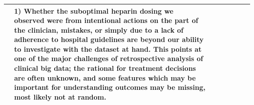 \begin{table}[!th]
\begin{tabular}{|p{3 em}|p{3 em}|p{3 em}|p{3em}|p{6em}|p{9em}|p{6 em}|p{6em}|}
& 
\textbf{1)} Whether the suboptimal heparin dosing we observed were from intentional actions on the part of the clinician, mistakes, or simply due to a lack of adherence to hospital guidelines are beyond our ability to investigate with the dataset at hand. This points at one of the major challenges of retrospective analysis of clinical big data; the rational for
treatment decisions are often unknown, and some features
which may be important for understanding outcomes may
be missing, most likely not at random.
   \\\midrule
\end{tabular}
\vspace*{-2em}
\end{table}   

